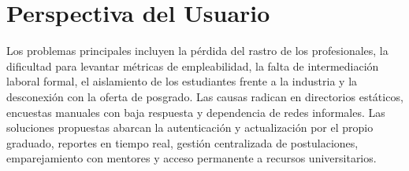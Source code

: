 \documentclass{./plantilla/umss}
\begin{document}
\section{Perspectiva del Usuario}

Los problemas principales incluyen la pérdida del rastro de los profesionales, la dificultad para levantar métricas de empleabilidad, la falta de intermediación laboral formal, el aislamiento de los estudiantes frente a la industria y la desconexión con la oferta de posgrado. Las causas radican en directorios estáticos, encuestas manuales con baja respuesta y dependencia de redes informales. Las soluciones propuestas abarcan la autenticación y actualización por el propio graduado, reportes en tiempo real, gestión centralizada de postulaciones, emparejamiento con mentores y acceso permanente a recursos universitarios.
\end{document}
